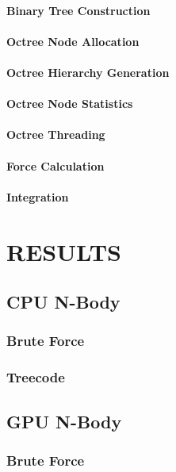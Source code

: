 \documentclass{thesis}
\begin{document}
\subsubsection{Binary Tree Construction}
\subsubsection{Octree Node Allocation}
\subsubsection{Octree Hierarchy Generation}
\subsubsection{Octree Node Statistics}
\subsubsection{Octree Threading}
\subsubsection{Force Calculation}
\subsubsection{Integration}
\chapter{RESULTS}
\section{CPU N-Body}
\subsection{Brute Force}
\subsection{Treecode}
\section{GPU N-Body}
\subsection{Brute Force}
\end{document}
